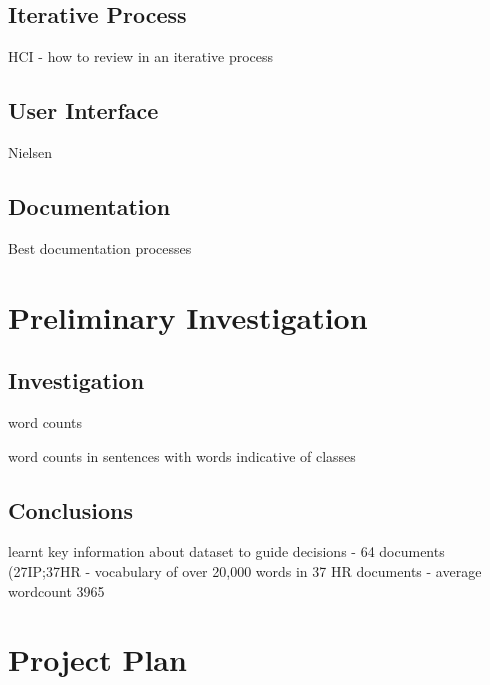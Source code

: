 		\subsection{Iterative Process}
			HCI - how to review in an iterative process
		\subsection{User Interface}
			Nielsen
		\subsection{Documentation}
			Best documentation processes
	\section{Preliminary Investigation}
		\subsection{Investigation}
			word counts
			
			word counts in sentences with words indicative of classes
		\subsection{Conclusions}
			learnt key information about dataset to guide decisions - 64 documents (27IP;37HR - vocabulary of over 20,000 words in 37 HR documents - average wordcount 3965
			\newpage
	\section{Project Plan}
